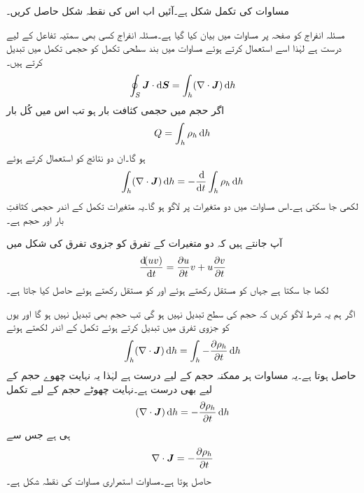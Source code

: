 مساوات   کی تکمل شکل ہے۔آئیں اب اس کی نقطہ شکل حاصل کریں۔

مسئلہ انفراج کو صفحہ  پر مساوات  میں بیان کیا گیا ہے۔مسئلہ انفراج کسی بھی سمتیہ  تفاعل کے لیے درست ہے لہٰذا اسے استعمال کرتے ہوئے مساوات  میں بند سطحی تکمل کو حجمی تکمل میں تبدیل کرتے ہیں۔
\begin{align*}
\oint_S \kvec{J} \cdot \dif \kvec{S}=\int_h (\nabla \cdot \kvec{J}) \dif h
\end{align*}
اگر حجم میں حجمی کثافت بار  ہو تب اس میں کُل بار
\begin{align*}
Q=\int_h \rho_h \dif h
\end{align*}
ہو گا۔ان دو نتائج کو استعمال کرتے ہوئے
\begin{align*}
\int_h (\nabla \cdot \kvec{J}) \dif h=-\frac{\dif}{\dif t} \int_h \rho_h \dif h
\end{align*}
لکھی جا سکتی ہے۔اس مساوات میں  دو متغیرات پر لاگو ہو گا۔یہ متغیرات تکمل کے اندر حجمی کثافتِ بار  اور حجم  ہے۔

آپ جانتے ہیں کہ دو متغیرات کے تفرق کو جزوی تفرق کی شکل میں
\begin{align*}
\frac{\dif (uv)}{\dif t}=\frac{\partial u}{\partial t} v+ u  \frac{\partial v}{\partial t}
\end{align*}
لکھا جا سکتا ہے جہاں  کو مستقل رکھتے ہوئے  اور  کو مستقل رکھتے ہوئے  حاصل کیا جاتا ہے۔

اگر ہم یہ شرط لاگو کریں کہ حجم کی سطح تبدیل نہیں ہو گی تب حجم بھی تبدیل نہیں ہو گا اور یوں  کو جزوی تفرق میں تبدیل کرتے ہوئے تکمل کے اندر لکھتے ہوئے
\begin{align*}
\int_h (\nabla \cdot \kvec{J}) \dif h=\int_h -\frac{\partial \rho_h}{\partial t} \dif h
\end{align*}
حاصل ہوتا ہے۔یہ مساوات ہر ممکنہ حجم کے لیے درست ہے لہٰذا یہ نہایت چھوے حجم کے لیے بھی درست ہے۔نہایت چھوٹے حجم  کے لیے تکمل
\begin{align*}
 (\nabla \cdot \kvec{J}) \dif h= -\frac{\partial \rho_h}{\partial t} \dif h
\end{align*}
ہی ہے جس سے
\begin{align}\label{مساوات_کپیسٹر_استمراری_مساوات_نقطہ_شکل}
\nabla \cdot {\ensuremath{{\boldsymbol{J}}}}=-\frac{\partial \rho_h}{\partial t}
\end{align}
حاصل ہوتا ہے۔مساوات  استمراری مساوات کی نقطہ شکل ہے۔

